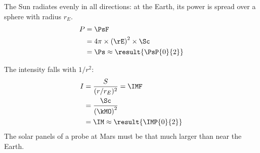 \begin{abcliste}
\abc The Sun radiates evenly in all directions: at the Earth, its power is spread over a sphere with radius $r_E$.
\begin{align}
 P &= \PsF \\
   &= 4\pi\times\left(\rE\right)^2\times\Sc \\
   &= \Ps \approx \result{\PsP{0}{2}}
\end{align}

\abc The intensity falls with $1/r^2$:
\begin{align}
 I &= \frac{S}{(r/r_E)^2} = \IMF \\
   &= \frac{\Sc}{\left(\kMO\right)^2} \\
   &= \IM \approx \result{\IMP{0}{2}}
\end{align}
The solar panels of a probe at Mars must be that much larger than near the Earth.
\end{abcliste}
